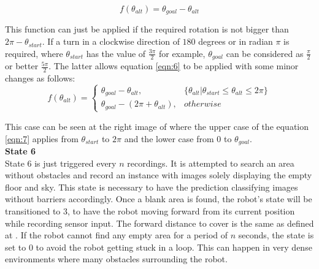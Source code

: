 \begin{equation}
\label{eqn:6} 
f(\theta_{alt}) = \theta_{goal} - \theta_{alt}
\end{equation}

This function can just be applied if the required rotation is not bigger than $2\pi-\theta_{start}$. If a turn in a clockwise direction of $ 180 $ degrees or in radian $\pi$ is required, where $\theta_{start}$ has the value of $\frac{3\pi}{2}$ for example, $\theta_{goal}$ can be considered as $\frac{\pi}{2}$ or better $\frac{5\pi}{2}$. The latter allows equation \ref{eqn:6} to be applied with some minor changes as follows:\\

\begin{equation}
\label{eqn:7} 
f(\theta_{alt}) =
\begin{cases}
\theta_{goal} - \theta_{alt}, &\{\theta_{alt} |\theta_{start} \leq \theta_{alt} \leq 2\pi \}\\
\theta_{goal} - (2\pi + \theta_{alt}), &{otherwise}
\end{cases}
\end{equation}

This case can be seen at the right image of  where the upper case of the equation \ref{eqn:7} applies from $\theta_{start}$ to $2\pi$ and the lower case from $0$ to $\theta_{goal}$.\\

\textbf{State 6}\\
State 6 is just triggered every $ n $ recordings. It is attempted to search an area without obstacles and record an instance with images solely displaying the empty floor and sky. This state is necessary to have the prediction classifying images without barriers accordingly. Once a blank area is found, the robot's state will be transitioned to 3, to have the robot moving forward from its current position while recording sensor input. The forward distance to cover is the same as defined at . If the robot cannot find any empty area for a period of $ n $ seconds, the state is set to $ 0 $ to avoid the robot getting stuck in a loop. This can happen in very dense environments where many obstacles surrounding the robot.\\

